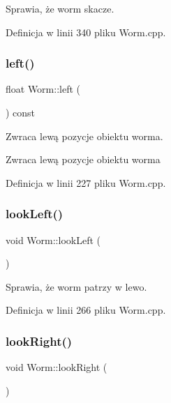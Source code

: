 Sprawia, że worm skacze. 



Definicja w linii 340 pliku Worm.\+cpp.

\mbox{\label{class_worm_ab517b492de0e583254c288cc583cbeb1}} 
\subsubsection{\texorpdfstring{left()}{left()}}
{\footnotesize\ttfamily float Worm\+::left (\begin{DoxyParamCaption}{ }\end{DoxyParamCaption}) const}



Zwraca lewą pozycje obiektu worma. 

\begin{DoxyReturn}{Zwraca}
lewą pozycje obiektu worma 
\end{DoxyReturn}


Definicja w linii 227 pliku Worm.\+cpp.

\mbox{\label{class_worm_a84fbbdac67be083a5492bf38cf83544b}} 
\subsubsection{\texorpdfstring{look\+Left()}{lookLeft()}}
{\footnotesize\ttfamily void Worm\+::look\+Left (\begin{DoxyParamCaption}{ }\end{DoxyParamCaption})}



Sprawia, że worm patrzy w lewo. 



Definicja w linii 266 pliku Worm.\+cpp.

\mbox{\label{class_worm_a4dbc714c26c5b09a94bd53f10172b4c1}} 
\subsubsection{\texorpdfstring{look\+Right()}{lookRight()}}
{\footnotesize\ttfamily void Worm\+::look\+Right (\begin{DoxyParamCaption}{ }\end{DoxyParamCaption})}



